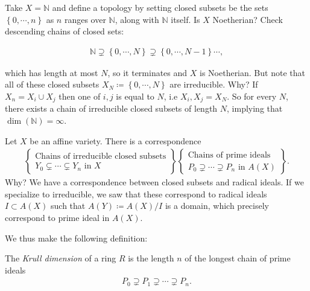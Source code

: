 \begin{example}

Take \(X = {\mathbb{N}}\) and define a topology by setting closed
subsets be the sets \(\left\{{0, \cdots, n}\right\}\) as \(n\) ranges
over \({\mathbb{N}}\), along with \({\mathbb{N}}\) itself. Is \(X\)
Noetherian? Check descending chains of closed sets:

\begin{align*}  
{\mathbb{N}}\supsetneq \left\{{0, \cdots, N}\right\} \supsetneq \left\{{0, \cdots, N-1}\right\} \cdots
,\end{align*}

which has length at most \(N\), so it terminates and \(X\) is
Noetherian. But note that all of these closed subsets
\(X_N \coloneqq\left\{{0, \cdots, N}\right\}\) are irreducible. Why? If
\(X_n = X_i \cup X_j\) then one of \(i, j\) is equal to \(N\), i.e
\(X_i, X_j = X_N\). So for every \(N\), there exists a chain of
irreducible closed subsets of length \(N\), implying that
\(\dim({\mathbb{N}}) = \infty\).

\end{example}

\begin{remark}

Let \(X\) be an affine variety. There is a correspondence
\begin{align*}  
\left\{{\substack{\text{Chains of irreducible closed subsets} \\ Y_0 \subsetneq \cdots \subsetneq Y_n \text{ in } X}}\right\}
\left\{{\substack{\text{Chains of prime ideals} \\ P_0\supsetneq \cdots \supsetneq P_n \text{ in } A(X)}}\right\}
.\end{align*}
Why? We have a correspondence between closed subsets and radical ideals.
If we specialize to irreducible, we saw that these correspond to radical
ideals \(I\subset A(X)\) such that \(A(Y) \coloneqq A(X) / I\) is a
domain, which precisely correspond to prime ideal in \(A(X)\).

\end{remark}

We thus make the following definition:

\begin{definition}

The \emph{Krull dimension} of a ring \(R\) is the length \(n\) of the
longest chain of prime ideals
\begin{align*}  
P_0 \supsetneq P_1 \supsetneq \cdots \supsetneq P_n
.\end{align*}

\end{definition}

